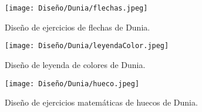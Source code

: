   \begin{figure}[ht!]
    \centering
    \texttt{[image: Diseño/Dunia/flechas.jpeg]}
    \caption{Diseño de ejercicios de flechas de Dunia.}
    \label{dunia4}
  \end{figure}

  \begin{figure}[ht!]
    \centering
    \texttt{[image: Diseño/Dunia/leyendaColor.jpeg]}
    \caption{Diseño de leyenda de colores de Dunia.}
    \label{dunia5}
  \end{figure}

  \begin{figure}[ht!]
    \centering
    \texttt{[image: Diseño/Dunia/hueco.jpeg]}
    \caption{Diseño de ejercicios matemáticas de huecos de Dunia.}
    \label{dunia6}
  \end{figure}